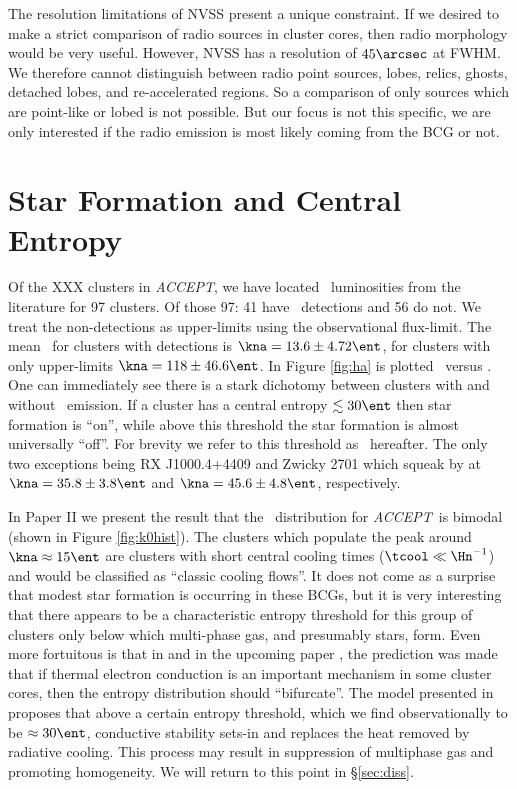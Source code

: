 \documentclass{emulateapj}
\newcommand{\accept}{\textit{ACCEPT}}
\begin{document}
The resolution limitations of NVSS present a unique constraint. If we
desired to make a strict comparison of radio sources in cluster cores,
then radio morphology would be very useful. However, NVSS has a
resolution of $45\arcsec$ at FWHM. We therefore cannot distinguish
between radio point sources, lobes, relics, ghosts, detached lobes, and
re-accelerated regions. So a comparison of only sources which are
point-like or lobed is not possible. But our focus is not this
specific, we are only interested if the radio emission is most likely
coming from the BCG or not.

\section{Star Formation and Central Entropy}
\label{sec:sf}

Of the XXX clusters in \accept, we have located \halpha\ luminosities
from the literature for 97 clusters. Of those 97: 41 have \halpha\
detections and 56 do not. We treat the non-detections as upper-limits
using the observational flux-limit. The mean \kna\ for clusters
with detections is $\kna = 13.6 \pm 4.72 \ent$, for clusters
with only upper-limits $\kna = 118 \pm 46.6 \ent$. In Figure
\ref{fig:ha} is plotted \lha\ versus \kna. One can immediately see
there is a stark dichotomy between clusters with and without \halpha\
emission. If a cluster has a central entropy $\lesssim 30 \ent$ then
star formation is ``on'', while above this threshold the star
formation is almost universally ``off''. For brevity we refer to this
threshold as \kthr\ hereafter. The only two exceptions being
RX J1000.4+4409 and Zwicky 2701 which squeak by at $\kna = 35.8 \pm
3.8 \ent$ and $\kna = 45.6 \pm 4.8 \ent$, respectively.

In Paper II we present the result that the \kna\ distribution for
\accept\ is bimodal (shown in Figure \ref{fig:k0hist}). The clusters
which populate the peak around $\kna \approx 15 \ent$ are clusters
with short central cooling times ($\tcool \ll \Hn^{-1}$) and would be
classified as ``classic cooling flows''. It does not come as a
surprise that modest star formation is occurring in these BCGs, but it
is very interesting that there appears to be a characteristic entropy
threshold for this group of clusters only below which multi-phase gas,
and presumably stars, form. Even more fortuitous is that in
\cite{2005ApJ...630L..13D} and in the upcoming paper
\cite{conduction}, the prediction was made that if thermal electron
conduction is an important mechanism in some cluster cores, then the
entropy distribution should ``bifurcate''. The model presented in
\cite{conduction} proposes that above a certain entropy threshold,
which we find observationally to be $\approx 30 \ent$, conductive
stability sets-in and replaces the heat removed by radiative
cooling. This process may result in suppression of multiphase gas
and promoting homogeneity. We will return to this point in
\S\ref{sec:diss}.
\end{document}
